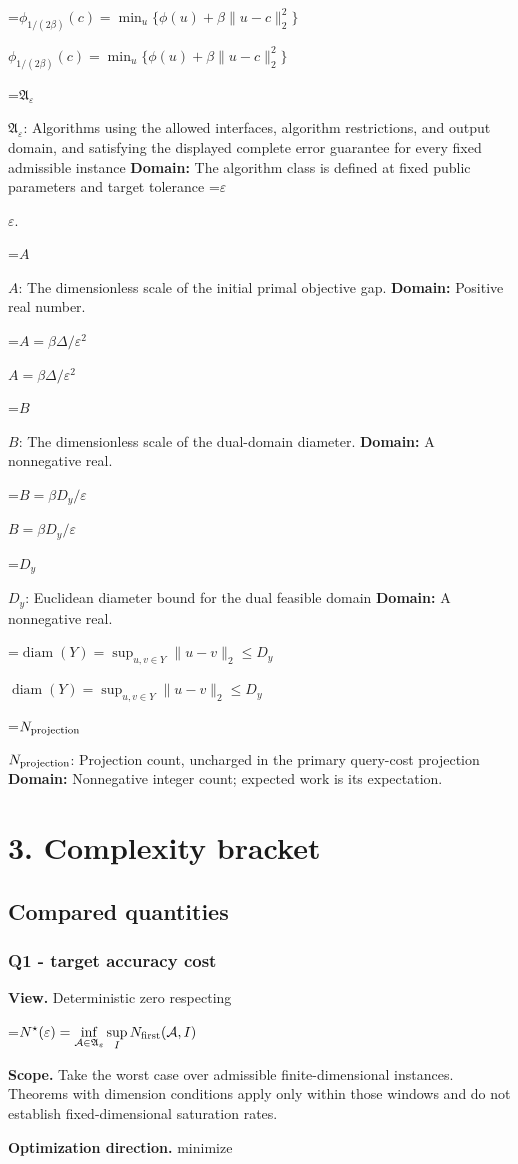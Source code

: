 \documentclass[10pt,a4paper]{article}
\newcommand{\AtlasMath}[1]{\par\begingroup\centering\setbox0=\hbox{$\displaystyle #1$}\ifdim\wd0>1.4\linewidth\typeout{ATLAS WIDE FORMULA: \the\wd0}\fi\ifdim\wd0>\linewidth\resizebox{\linewidth}{!}{\box0}\else\box0\fi\par\endgroup}
\newcommand{\AtlasInlineMath}[1]{\begingroup\setbox0=\hbox{$#1$}\ifdim\wd0>.4\linewidth\endgroup\AtlasMath{#1}\else\endgroup$#1$\fi}
\begin{document}
\AtlasInlineMath{\phi_{1/(2\beta)}(c)=\min_u\{\phi(u)+\beta\|u-c\|_2^2\}}

\AtlasInlineMath{\mathfrak A_\varepsilon}: Algorithms using the allowed interfaces, algorithm restrictions, and output domain, and satisfying the displayed complete error guarantee for every fixed admissible instance \textbf{Domain:} The algorithm class is defined at fixed public parameters and target tolerance \AtlasInlineMath{\varepsilon}.

\AtlasInlineMath{A}: The dimensionless scale of the initial primal objective gap. \textbf{Domain:} Positive real number.

\AtlasInlineMath{A=\beta\Delta/\varepsilon^2}

\AtlasInlineMath{B}: The dimensionless scale of the dual-domain diameter. \textbf{Domain:} A nonnegative real.

\AtlasInlineMath{B=\beta D_y/\varepsilon}

\AtlasInlineMath{D_y}: Euclidean diameter bound for the dual feasible domain \textbf{Domain:} A nonnegative real.

\AtlasInlineMath{\operatorname{diam}(Y)=\sup_{u,v\in Y}\|u-v\|_2\le D_y}

\AtlasInlineMath{N_{\rm projection}}: Projection count, uncharged in the primary query-cost projection \textbf{Domain:} Nonnegative integer count; expected work is its expectation.

\section{3. Complexity bracket}
\subsection{Compared quantities}
\subsubsection{Q1 - target accuracy cost}
\textbf{View.} Deterministic zero respecting

\AtlasMath{N^\star(\varepsilon)=\inf_{\mathcal A\in\mathfrak A_\varepsilon}\sup_I N_{\rm first}(\mathcal A,I)}
\textbf{Scope.} Take the worst case over admissible finite-dimensional instances. Theorems with dimension conditions apply only within those windows and do not establish fixed-dimensional saturation rates.

\textbf{Optimization direction.} minimize
\end{document}

